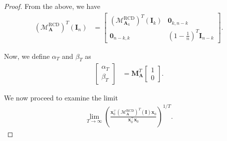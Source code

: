 \documentclass{article}
\theoremstyle{plain}
\theoremstyle{definition}
\theoremstyle{remark}
\def\bigopen#1{\left(#1\right)}
\newcommand{\RCD}{\text{RCD}} %
\newcommand{\MARCD}{\mathcal{M}_{\bm{A}}^{\RCD}} %
\def\vzero{{\bm{0}}}
\def\vx{{\bm{x}}}
\def\mA{{\bm{A}}}
\def\mI{{\bm{I}}}
\def\mM{{\bm{M}}}
\def\gM{{\mathcal{M}}}
\begin{document}
\begin{proof}
From the above, we have 
\begin{align*}
    (\MARCD)^T(\mI_n) &= \begin{bmatrix}
        (\gM_{\mA_k}^{\RCD})^T (\mI_k) & \vzero_{k, n-k} \\
        \vzero_{n-k, k} & \bigopen{1-\frac{1}{n}}^T \mI_{n-k}
    \end{bmatrix}.
\end{align*}

Now, we define $\alpha_T$ and $\beta_T$ as 
\begin{align*}
    \begin{bmatrix}
        \alpha_T\\
        \beta_T
    \end{bmatrix} &= \mM_{\mA}^T 
    \begin{bmatrix}
        1\\
        0
    \end{bmatrix}.
\end{align*}

We now proceed to examine the limit 
\begin{align*}
    \lim_{T \to \infty} \bigopen{\frac{\vx_0^{\top} (\MARCD)^T (\mI) \vx_0}{\vx_0^{\top} \vx_0}}^{1/T}.
\end{align*}


\end{proof}
\end{document}
